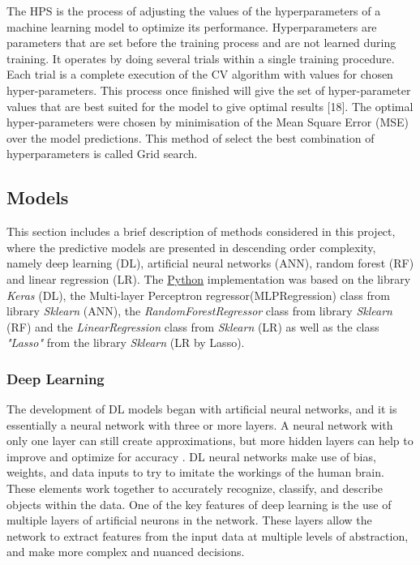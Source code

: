 \documentclass[journal]{IEEEtran} %
\begin{document}
The HPS is the process of adjusting the values of the hyperparameters of a machine learning model to optimize its performance. Hyperparameters are parameters that are set before the training process and are not learned during training. It operates by doing several trials within a single training procedure. Each trial is a complete execution of the CV algorithm with values for chosen hyper-parameters. This process once finished will give the set of hyper-parameter values that are best suited for the model to give optimal results [18]. The optimal hyper-parameters were chosen by minimisation of the Mean Square Error (MSE) over the model predictions. This method of select the best combination of hyperparameters is called Grid search.

\subsection{Models}
This section includes a brief description of methods considered in this project, where the predictive models are presented in descending order complexity, namely deep learning (DL), artificial neural networks (ANN), random forest (RF) and linear regression (LR).
The \hyperlink{https://www.python.org/}{Python} implementation was based on the library \textit{Keras} (DL), the Multi-layer Perceptron regressor(MLPRegression) class from library \textit{Sklearn} (ANN), the \textit{RandomForestRegressor} class from library \textit{Sklearn} (RF) and the \textit{LinearRegression} class from \textit{Sklearn} (LR) as well as the class \textit{"Lasso"} from the library \textit{Sklearn} (LR by Lasso).\newline

\subsubsection{Deep Learning}
The development of DL models began with artificial neural networks, and it is essentially a neural network with three or more layers. A neural network with only one layer can still create approximations, but more hidden layers can help to improve and optimize for accuracy \cite{Alzubaidi2021}. DL neural networks make use of bias, weights, and data inputs to try to imitate the workings of the human brain. These elements work together to accurately recognize, classify, and describe objects within the data. One of the key features of deep learning is the use of multiple layers of artificial neurons in the network. These layers allow the network to extract features from the input data at multiple levels of abstraction, and make more complex and nuanced decisions.
\end{document}
